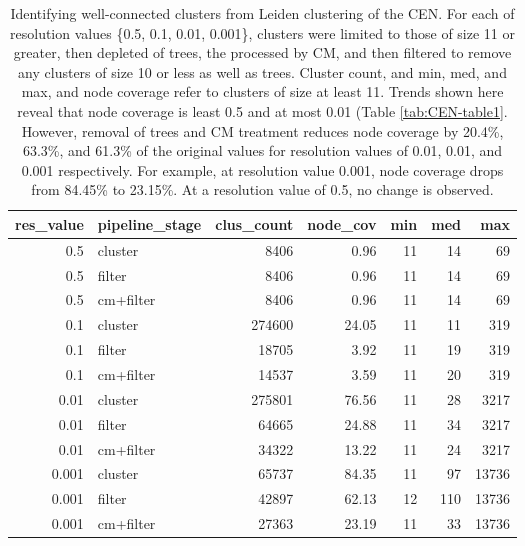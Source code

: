 \documentclass[11pt]{article}   	%
\begin{document}
\begin{table}[ht]
\centering
\begin{tabular}{rlrrrrr}
  \hline
res\_value & pipeline\_stage & clus\_count & node\_cov & min & med & max \\ 
  \hline
0.5 & cluster &  8406 & 0.96 &    11 & 14 &    69 \\ 
  0.5 & filter &  8406 & 0.96 &    11 & 14 &    69 \\ 
  0.5 & cm+filter &  8406 & 0.96 &    11 & 14 &    69 \\ 
  \hline
  0.1 & cluster & 274600 & 24.05 &    11 & 11 &   319 \\ 
  0.1 & filter & 18705 & 3.92 &    11 & 19 &   319 \\ 
  0.1 & cm+filter & 14537 & 3.59 &    11 & 20 &   319 \\ 
  \hline
  0.01 & cluster & 275801 & 76.56 &    11 & 28 &  3217 \\ 
  0.01 & filter & 64665 & 24.88 &    11 & 34 &  3217 \\ 
  0.01 & cm+filter & 34322 & 13.22 &    11 & 24 &  3217 \\ 
  \hline
  0.001 & cluster & 65737 & 84.35 &    11 & 97 & 13736 \\ 
  0.001 & filter & 42897 & 62.13 &    12 & 110 & 13736 \\ 
  0.001 & cm+filter & 27363 & 23.19 &    11 & 33 & 13736 \\ 
   \hline
\end{tabular}
\caption{Identifying well-connected clusters from Leiden clustering of the CEN. For each of resolution values \{0.5, 0.1, 0.01, 0.001\}, clusters were limited to those of size 11 or greater, then depleted of trees, the processed by CM, and then filtered to remove any clusters of size 10 or less as well as trees. Cluster count, and min, med, and max, and node coverage refer to clusters of size at least 11.
Trends shown here reveal that node coverage is least 0.5 and at most  0.01 (Table \ref{tab:CEN-table1}. However, removal of trees and CM treatment reduces node coverage by 20.4\%, 63.3\%, and 61.3\% of the original values for resolution values of 0.01, 0.01, and 0.001 respectively.  For example, at resolution value 0.001, node coverage drops from 84.45\% to 23.15\%. At a resolution value of 0.5, no change is observed.}
\label{tab:CEN-Leiden-11-CM}
\end{table}
\end{document}
